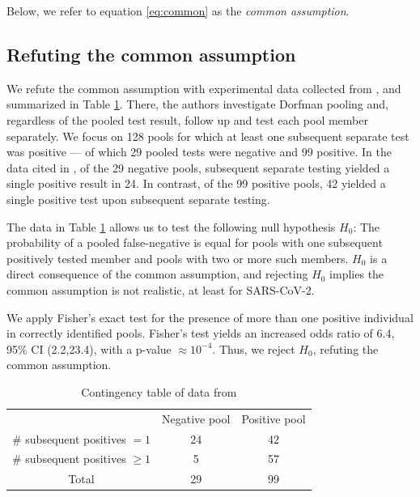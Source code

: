 \documentclass{article}
\begin{document}
Below, we refer to equation \eqref{eq:common} as the \emph{common
  assumption}. 

\subsection*{Refuting the common assumption}\label{subsec:refute}
We refute the common assumption with experimental data collected from
\cite{Salazar}, and summarized in Table \ref{table}. There, the
authors investigate Dorfman pooling and, regardless of the pooled test
result, follow up and test each pool member separately. We focus on
128 pools for which at least one subsequent separate test was positive
--- of which 29 pooled tests were negative and 99 positive. In the
data cited in \cite{Salazar}, of the 29 negative pools, subsequent
separate testing yielded a single positive result in 24. In contrast,
of the 99 positive pools, 42 yielded a single positive test upon
subsequent separate testing.

The data in Table \ref{table} allows us to test the following null
hypothesis $H_0$: The probability of a pooled false-negative is equal
for pools with one subsequent positively tested member and pools with
two or more such members. $H_0$ is a direct consequence of the common
assumption, and rejecting $H_0$ implies the common assumption is not
realistic, at least for SARS-CoV-2.

We apply Fisher's exact test for the presence of more than one
positive individual in correctly identified pools. Fisher's test
yields an increased odds ratio of 6.4, 95\% CI (2.2,23.4), with a
p-value $\approx 10^{-4}$. Thus, we reject $H_0$, refuting the common
assumption.

\begin{table}[h]
\centering
\begin{tabular}{ c c c }
                                & Negative pool  & Positive pool \\%
\# subsequent positives $=1$    & 24             & 42            \\%
\# subsequent positives $\geq1$ & 5              & 57            \\%
 Total                          & 29             & 99            \\%
\end{tabular}
\caption{Contingency table of data from \cite{Salazar}}\label{table}
\end{table}
\end{document}
